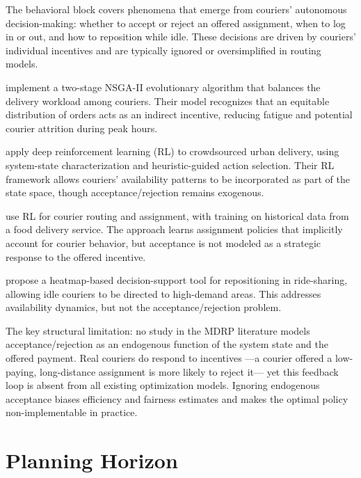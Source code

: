 \documentclass[12pt,a4paper]{report}
\begin{document}
The behavioral block covers phenomena that emerge from couriers' autonomous decision-making: whether to accept or reject an offered assignment, when to log in or out, and how to reposition while idle. These decisions are driven by couriers' individual incentives and are typically ignored or oversimplified in routing models.

\citet{liao2020multi} implement a two-stage NSGA-II evolutionary algorithm that balances the delivery workload among couriers. Their model recognizes that an equitable distribution of orders acts as an indirect incentive, reducing fatigue and potential courier attrition during peak hours.

\citet{ahamed2020deep} apply deep reinforcement learning (RL) to crowdsourced urban delivery, using system-state characterization and heuristic-guided action selection. Their RL framework allows couriers' availability patterns to be incorporated as part of the state space, though acceptance/rejection remains exogenous.

\citet{bozanta2022courier} use RL for courier routing and assignment, with training on historical data from a food delivery service. The approach learns assignment policies that implicitly account for courier behavior, but acceptance is not modeled as a strategic response to the offered incentive.

\citet{haferkamp2022heatmap} propose a heatmap-based decision-support tool for repositioning in ride-sharing, allowing idle couriers to be directed to high-demand areas. This addresses availability dynamics, but not the acceptance/rejection problem.

The key structural limitation: no study in the MDRP literature models
acceptance/rejection as an endogenous function of the system state and the offered payment. Real couriers do respond to incentives ---a courier offered a low-paying, long-distance assignment is more likely to reject it--- yet this feedback loop is absent from all existing optimization models. Ignoring endogenous acceptance biases efficiency and fairness estimates and makes the optimal policy non-implementable in practice.

\section{Planning Horizon}
\label{sec:planning}
\end{document}
